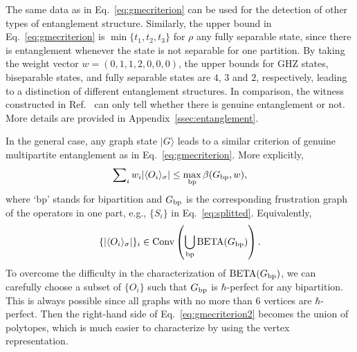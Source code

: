 \documentclass[
12pt,
prx,
aps,
reprint,
a4paper,
longbibliograph,
nofootinbib,
nobibnotes,
superscriptaddress
]{revtex4-2}
\theoremstyle{definition}
\def\conv{\mathrm{Conv}}
\def\be{\operatorname{BETA}}
\begin{document}
The same data as in Eq.~\eqref{eq:gmecriterion} can be used for the detection of other types of entanglement structure.
Similarly, the upper bound in Eq.~\eqref{eq:gmecriterion} is $\min \{t_1, t_2, t_3\}$ for $\rho$ any fully separable state, since there is entanglement whenever the state is not separable for one partition. By taking the weight vector $w=(0,1,1,2,0,0,0)$, the upper bounds for GHZ states, biseparable states, and fully separable states are $4$, $3$ and $2$, respectively, leading to a distinction of different entanglement structures.
In comparison, the witness constructed in Ref.~\cite{zhou2019detecting} can only tell whether there is genuine entanglement or not. 
More details are provided in Appendix~\ref{ssec:entanglement}.


In the general case, any graph state $|G\rangle$ leads to a similar criterion of genuine multipartite entanglement as in Eq.~\eqref{eq:gmecriterion}. More explicitly,
\begin{equation}
	\sum\nolimits_i w_i |\langle O_i\rangle_{\sigma}| \le \max_{\rm bp} \beta(G_{\rm bp},w),
\end{equation}
where `bp' stands for bipartition and $G_{\rm bp}$ is the corresponding frustration graph of the operators in one part, e.g., $\{S_i\}$ in Eq.~\eqref{eq:splitted}.
Equivalently,
\begin{equation}\label{eq:gmecriterion2}
\{|\langle O_i\rangle_{\sigma}| \}_{i} \in  \conv\left(\bigcup_{\rm bp}{\be(G_{\rm bp})}\right).
\end{equation}
To overcome the difficulty in the characterization of $\be(G_{\rm bp})$, we can carefully choose a subset of $\{O_i\}$ such that $G_{\rm bp}$ is $\hbar$-perfect for any bipartition. This is always possible since all graphs with no more than $6$ vertices are $\hbar$-perfect. Then the right-hand side of Eq.~\eqref{eq:gmecriterion2} becomes the union of polytopes, which is much easier to characterize by using the vertex representation.
\end{document}
